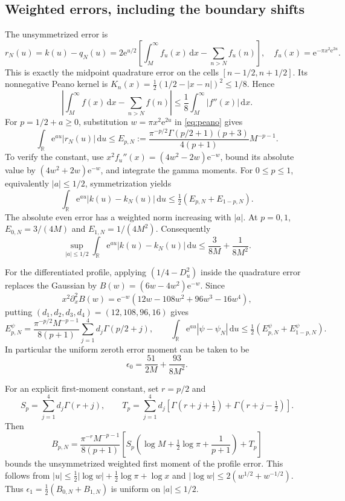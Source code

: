 \documentclass[11pt,letterpaper]{article}
\numberwithin{equation}{section}
\theoremstyle{remark}\newtheorem{remark}[theorem]{Remark}
\newcommand{\R}{\mathbb R}
\newcommand{\dd}{\,\mathrm d}
\newcommand{\ee}{\mathrm e}
\begin{document}
\subsection{Weighted errors, including the boundary shifts}
The unsymmetrized error is
\[
r_N(u)=k(u)-q_N(u)
=2\ee^{u/2}\left[\int_M^\infty f_u(x)\dd x-\sum_{n>N}f_u(n)\right],
\quad f_u(x)=\ee^{-\pi x^2\ee^{2u}}.
\]
This is exactly the midpoint quadrature error on the cells $[n-1/2,n+1/2]$. Its nonnegative Peano kernel is
$K_n(x)=\tfrac12(1/2-|x-n|)^2\le1/8$. Hence
\begin{equation}\label{eq:peano}
\left|\int_M^\infty f(x)\dd x-\sum_{n>N}f(n)\right|
\le\frac18\int_M^\infty|f''(x)|\dd x.
\end{equation}
For $p=1/2+a\ge0$, substitution $w=\pi x^2\ee^{2u}$ in \eqref{eq:peano} gives
\begin{equation}\label{eq:primitiveError}
\int_{\R}\ee^{au}|r_N(u)|\dd u\le
E_{p,N}:=\frac{\pi^{-p/2}\Gamma(p/2+1)(p+3)}{4(p+1)}M^{-p-1}.
\end{equation}
To verify the constant, use $x^2f_u''(x)=(4w^2-2w)\ee^{-w}$, bound its absolute value by $(4w^2+2w)\ee^{-w}$, and integrate the gamma moments. For $0\le p\le1$, equivalently $|a|\le1/2$, symmetrization yields
\[
\int_{\R}\ee^{au}|k(u)-k_N(u)|\dd u
\le\tfrac12(E_{p,N}+E_{1-p,N}).
\]
The absolute even error has a weighted norm increasing with $|a|$. At $p=0,1$, $E_{0,N}=3/(4M)$ and $E_{1,N}=1/(4M^2)$. Consequently
\begin{equation}\label{eq:uniformPrimitive}
\boxed{\sup_{|a|\le1/2}\int_{\R}\ee^{au}|k(u)-k_N(u)|\dd u
\le\frac{3}{8M}+\frac1{8M^2}.}
\end{equation}

For the differentiated profile, applying $(1/4-D_u^2)$ inside the quadrature error replaces the Gaussian by $B(w)=(6w-4w^2)\ee^{-w}$. Since
\[
x^2\partial_x^2B(w)
=\ee^{-w}(12w-108w^2+96w^3-16w^4),
\]
putting $(d_1,d_2,d_3,d_4)=(12,108,96,16)$ gives
\begin{equation}\label{eq:profileError}
E^\psi_{p,N}=
\frac{\pi^{-p/2}M^{-p-1}}{8(p+1)}\sum_{j=1}^4d_j\Gamma(p/2+j),
\qquad
\int_{\R}\ee^{au}|\psi-\psi_N|\dd u
\le\tfrac12(E^\psi_{p,N}+E^\psi_{1-p,N}).
\end{equation}
In particular the uniform zeroth error moment can be taken to be
\begin{equation}\label{eq:epsilon0}
\epsilon_0=\frac{51}{2M}+\frac{93}{8M^2}.
\end{equation}

For an explicit first-moment constant, set $r=p/2$ and
\[
S_p=\sum_{j=1}^4d_j\Gamma(r+j),\qquad
T_p=\sum_{j=1}^4d_j[\Gamma(r+j+\tfrac12)+\Gamma(r+j-\tfrac12)].
\]
Then
\begin{equation}\label{eq:firstMoment}
B_{p,N}=\frac{\pi^{-r}M^{-p-1}}{8(p+1)}
\left[S_p\left(\log M+\tfrac12\log\pi+\frac1{p+1}\right)+T_p\right]
\end{equation}
bounds the unsymmetrized weighted first moment of the profile error. This follows from
$|u|\le\tfrac12|\log w|+\tfrac12\log\pi+\log x$ and
$|\log w|\le2(w^{1/2}+w^{-1/2})$. Thus
$\epsilon_1=\tfrac12(B_{0,N}+B_{1,N})$ is uniform on $|a|\le1/2$.
\end{document}

